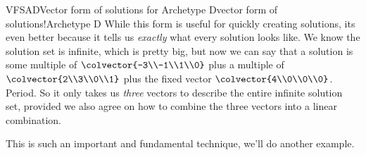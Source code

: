 \begin{example}{VFSAD}{Vector form of solutions for Archetype D}{vector form of solutions!Archetype D}
%
While this form is useful for quickly creating solutions, its even better because it tells us {\em exactly} what every solution looks like.  We know the solution set is infinite, which is pretty big, but now we can say that a solution is some multiple of $\colvector{-3\\-1\\1\\0}$ plus a multiple of $\colvector{2\\3\\0\\1}$ plus the fixed vector $\colvector{4\\0\\0\\0}$.  Period.  So it only takes us {\em three} vectors to describe the entire infinite solution set, provided we also agree on how to combine the three vectors into a linear combination.
\end{example}
%
This is such an important and fundamental technique, we'll do another example.
%
